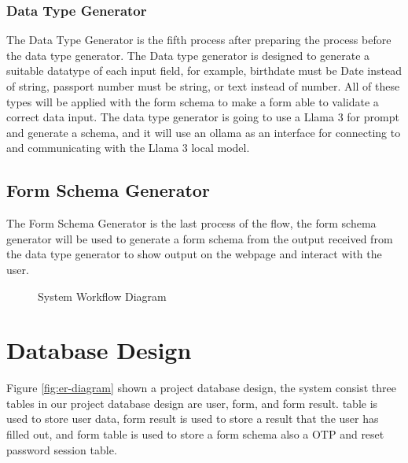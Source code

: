 \documentclass[12pt,oneside,openright,a4paper]{cpe-english-project}
\begin{document}
\subsubsection{Data Type Generator}

The Data Type Generator is the fifth process after preparing the process before the data type generator. The Data type generator is designed to generate a suitable datatype of each input field, for example, birthdate must be Date instead of string, passport number must be string, or text instead of number. All of these types will be applied with the form schema to make a form able to validate a correct data input. The data type generator is going to use a Llama 3 for prompt and generate a schema, and it will use an ollama as an interface for connecting to and communicating with the Llama 3 local model.

\subsection{Form Schema Generator}

The Form Schema Generator is the last process of the flow, the form schema generator will be used to generate a form schema from the output received from the data type generator to show output on the webpage and interact with the user.

\begin{figure}[!h]
\centering
{}
\caption{System Workflow Diagram}\label{fig:system-workflow}
\end{figure}

\newpage

\section{Database Design}

Figure \ref{fig:er-diagram} shown a project database design, the system consist three tables in our project database design are user, form, and form result. table is used to store user data, form result is used to store a result that the user has filled out, and form table is used to store a form schema also a OTP and reset password session table.
\end{document}
